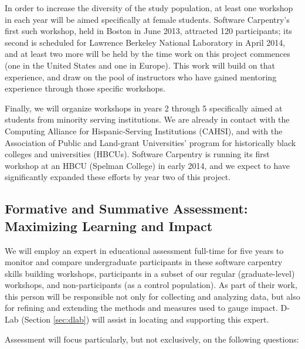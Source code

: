 \documentclass{proposalnsf}
\newlength{\up}
\begin{document}
In order to increase the diversity of the study population, at least
one workshop in each year will be aimed specifically at female
students.  Software Carpentry's first such workshop, held in Boston in
June 2013, attracted 120 participants; its second is scheduled for
Lawrence Berkeley National Laboratory in April 2014, and at least two
more will be held by the time work on this project commences (one in
the United States and one in Europe).  This work will build on that
experience, and draw on the pool of instructors who have gained
mentoring experience through those specific workshops.

Finally, we will organize workshops in years 2 through 5 specifically aimed at students from minority serving institutions.
We are already in contact with the Computing Alliance for
Hispanic-Serving Institutions (CAHSI), and with the Association of
Public and Land-grant Universities' program for historically black
colleges and universities (HBCUs). Software Carpentry is running its
first workshop at an HBCU (Spelman College) in early 2014, and we expect to
have significantly expanded these efforts by year two of this project.

\subsection{Formative and Summative Assessment: Maximizing Learning and Impact}

We will employ an expert in educational assessment full-time for five
years to monitor and compare undergraduate participants in these
software carpentry skills building workshops, participants in a subset
of our regular (graduate-level) workshops, and non-participants (as a
control population).  As part of their work, this person will be
responsible not only for collecting and analyzing data, but also for
refining and extending the methods and measures used to gauge impact. D-Lab (Section \ref{sec:dlab}) will assist in locating and supporting this expert.

Assessment will focus particularly, but not exclusively, on the
following questions:
\end{document}
